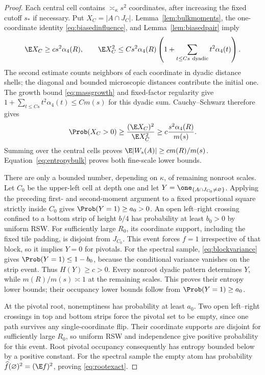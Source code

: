 \begin{proof}
Each central cell contains $\asymp_\kappa s^2$ coordinates, after increasing the fixed cutoff $s_*$ if necessary. Put $X_C=|A\cap J_C|$. Lemma~\ref{lem:bulkmoments}, the one-coordinate identity \eqref{eq:biasedinfluence}, and Lemma~\ref{lem:biasedpair} imply
\[
 \E X_C\ge cs^2\alpha_4(R),\qquad
 \E X_C^2\le Cs^2\alpha_4(R)
             \left(1+\sum_{t\le Cs\ \mathrm{dyadic}}t^2\alpha_4(t)\right).
\]
The second estimate counts neighbors of each coordinate in dyadic distance shells; the diagonal and bounded microscopic distances contribute the initial one. The growth bound \eqref{eq:massgrowth} and fixed-factor regularity give $1+\sum_{t\le Cs}t^2\alpha_4(t)\le Cm(s)$ for this dyadic sum. Cauchy--Schwarz therefore gives
\[
 \Prob(X_C>0)\ge\frac{(\E X_C)^2}{\E X_C^2}
 \ge c\frac{s^2\alpha_4(R)}{m(s)}.
\]
Summing over the central cells proves $\E|W_s(A)|\ge cm(R)/m(s)$. Equation~\eqref{eq:entropybulk} proves both fine-scale lower bounds.

There are only a bounded number, depending on $\kappa$, of remaining nonroot scales. Let $C_0$ be the upper-left cell at depth one and let $Y=\one_{\{A\cap J_{C_0}\ne\varnothing\}}$. Applying the preceding first- and second-moment argument to a fixed proportional square strictly inside $C_0$ gives $\Prob(Y=1)\ge a_0>0$. An open left--right crossing confined to a bottom strip of height $b/4$ has probability at least $b_0>0$ by uniform RSW. For sufficiently large $R_0$, its coordinate support, including the fixed tile padding, is disjoint from $J_{C_0}$. This event forces $f=1$ irrespective of that block, so it implies $Y=0$ for pivotals. For the spectral sample, \eqref{eq:blockvariance} gives $\Prob(Y=1)\le1-b_0$, because the conditional variance vanishes on the strip event. Thus $H(Y)\ge c>0$. Every nonroot dyadic pattern determines $Y$, while $m(R)/m(s)\asymp1$ at the remaining scales. This proves their entropy lower bounds; their occupancy lower bounds follow from $\Prob(Y=1)\ge a_0$.

At the pivotal root, nonemptiness has probability at least $a_0$. Two open left--right crossings in top and bottom strips force the pivotal set to be empty, since one path survives any single-coordinate flip. Their coordinate supports are disjoint for sufficiently large $R_0$, so uniform RSW and independence give positive probability for this event. Root pivotal occupancy consequently has entropy bounded below by a positive constant. For the spectral sample the empty atom has probability $\widehat f(\varnothing)^2=(\E f)^2$, proving \eqref{eq:rootexact}.
\end{proof}

